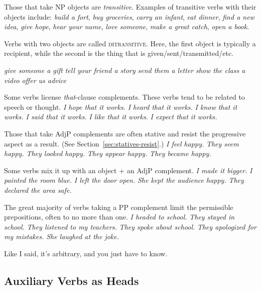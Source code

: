 Those that take NP objects are \textit{transitive}. Examples of transitive verbs with their objects include: \textit{build a fort}, \textit{buy groceries}, \textit{carry an infant}, \textit{eat dinner}, \textit{find a new idea}, \textit{give hope}, \textit{hear your name}, \textit{love someone}, \textit{make a great catch}, \textit{open a book}.

Verbs with two objects are called \textsc{ditransitive}. Here, the first object is typically a recipient, while the second is the thing that is given/sent/transmitted/etc.

\ea \label{ex:ditransitive}
\ea\textit{give someone a gift}
\ex\textit{tell your friend a story}
\ex\textit{send them a letter}
\ex\textit{show the class a video}
\ex\textit{offer us advice}
\z\z

\noindent Some verbs license \textit{that}-clause complements. These verbs tend to be related to speech or thought.
\ea \label{ex:that-comps}
\ea\textit{I hope that it works.}
\ex\textit{I heard that it works.}
\ex\textit{I know that it works.}
\ex\textit{I said that it works.}
\ex\textit{I like that it works.}
\ex\textit{I expect that it works.}
\z\z

\noindent Those that take AdjP complements are often stative and resist the progressive aspect as a result. (See Section~\ref{sec:statives-resist}.)
\ea \label{ex:AdjP-comps}
\ea\textit{I feel happy.}
\ex\textit{They seem happy.}
\ex\textit{They looked happy.}
\ex\textit{They appear happy.}
\ex\textit{They became happy.}
\z\z

\noindent Some verbs mix it up with an object + an AdjP complement.
\ea \label{ex:obj+AdjP-comps}
\ea\textit{I made it bigger.}
\ex\textit{I painted the room blue.}
\ex\textit{I left the door open.}
\ex\textit{She kept the audience happy.}
\ex\textit{They declared the area safe.}
\z\z

\noindent The great majority of verbs taking a PP complement limit the permissible prepositions, often to no more than one.
\ea \label{ex:PP-comps}
\ea\textit{I headed to school.}
\ex\textit{They stayed in school.}
\ex\textit{They listened to my teachers.}
\ex\textit{They spoke about school.}
\ex\textit{They apologized for my mistakes.}
\ex\textit{She laughed at the joke.}
\z\z

Like I said, it's arbitrary, and you just have to know.

\subsection{Auxiliary Verbs as Heads}\label{sec:Aux-as-head}

